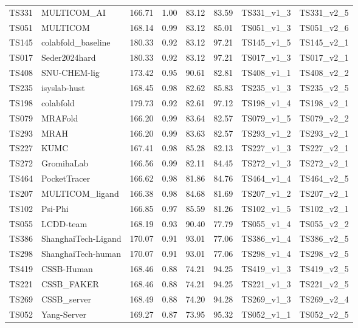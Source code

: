 \begin{longtable}{llllllll}
TS331 & MULTICOM\_AI & 166.71 & 1.00 & 83.12 & 83.59 & TS331\_v1\_3 & TS331\_v2\_5 \\ 
TS051 & MULTICOM & 168.14 & 0.99 & 83.12 & 85.01 & TS051\_v1\_3 & TS051\_v2\_6 \\ 
TS145 & colabfold\_baseline & 180.33 & 0.92 & 83.12 & 97.21 & TS145\_v1\_5 & TS145\_v2\_1 \\ 
TS017 & Seder2024hard & 180.33 & 0.92 & 83.12 & 97.21 & TS017\_v1\_3 & TS017\_v2\_1 \\ 
TS408 & SNU-CHEM-lig & 173.42 & 0.95 & 90.61 & 82.81 & TS408\_v1\_1 & TS408\_v2\_2 \\ 
TS235 & isyslab-hust & 168.45 & 0.98 & 82.62 & 85.83 & TS235\_v1\_3 & TS235\_v2\_5 \\ 
TS198 & colabfold & 179.73 & 0.92 & 82.61 & 97.12 & TS198\_v1\_4 & TS198\_v2\_1 \\ 
TS079 & MRAFold & 166.20 & 0.99 & 83.64 & 82.57 & TS079\_v1\_5 & TS079\_v2\_2 \\ 
TS293 & MRAH & 166.20 & 0.99 & 83.63 & 82.57 & TS293\_v1\_2 & TS293\_v2\_1 \\ 
TS227 & KUMC & 167.41 & 0.98 & 85.28 & 82.13 & TS227\_v1\_3 & TS227\_v2\_1 \\ 
TS272 & GromihaLab & 166.56 & 0.99 & 82.11 & 84.45 & TS272\_v1\_3 & TS272\_v2\_1 \\ 
TS464 & PocketTracer & 166.62 & 0.98 & 81.86 & 84.76 & TS464\_v1\_4 & TS464\_v2\_5 \\ 
TS207 & MULTICOM\_ligand & 166.38 & 0.98 & 84.68 & 81.69 & TS207\_v1\_2 & TS207\_v2\_1 \\ 
TS102 & Psi-Phi & 166.85 & 0.97 & 85.59 & 81.26 & TS102\_v1\_5 & TS102\_v2\_1 \\ 
TS055 & LCDD-team & 168.19 & 0.93 & 90.40 & 77.79 & TS055\_v1\_4 & TS055\_v2\_2 \\ 
TS386 & ShanghaiTech-Ligand & 170.07 & 0.91 & 93.01 & 77.06 & TS386\_v1\_4 & TS386\_v2\_5 \\ 
TS298 & ShanghaiTech-human & 170.07 & 0.91 & 93.01 & 77.06 & TS298\_v1\_4 & TS298\_v2\_5 \\ 
TS419 & CSSB-Human & 168.46 & 0.88 & 74.21 & 94.25 & TS419\_v1\_3 & TS419\_v2\_5 \\ 
TS221 & CSSB\_FAKER & 168.46 & 0.88 & 74.21 & 94.25 & TS221\_v1\_3 & TS221\_v2\_5 \\ 
TS269 & CSSB\_server & 168.49 & 0.88 & 74.20 & 94.28 & TS269\_v1\_3 & TS269\_v2\_4 \\ 
TS052 & Yang-Server & 169.27 & 0.87 & 73.95 & 95.32 & TS052\_v1\_1 & TS052\_v2\_5 \\ 

\end{longtable}
